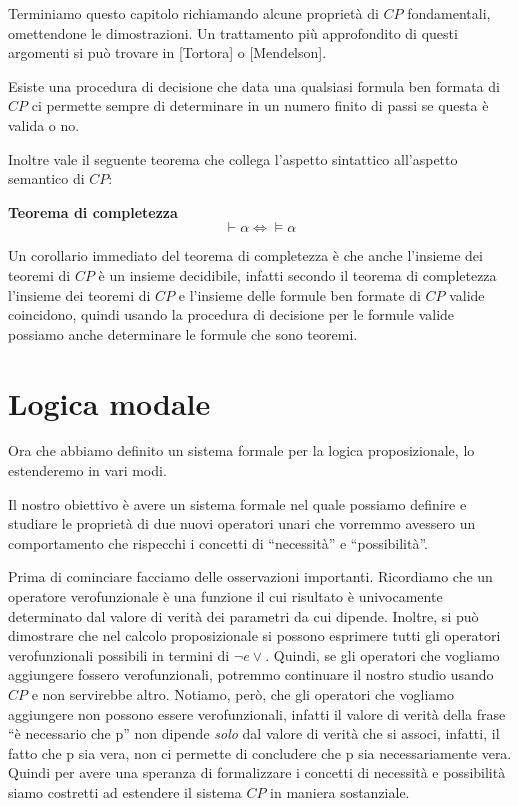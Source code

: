 \documentclass[a4paper, titlepage, 12pt]{report}
\begin{document}
Terminiamo questo capitolo richiamando alcune proprietà di $CP$ fondamentali, omettendone
le dimostrazioni. Un trattamento più approfondito di questi argomenti si può trovare in
[Tortora] o [Mendelson].

Esiste una procedura di decisione che data una qualsiasi formula ben formata di $CP$
ci permette sempre di determinare in un numero finito di passi se questa è valida o no.

Inoltre vale il seguente teorema che collega l'aspetto sintattico all'aspetto semantico
di $CP$:

\begin{flushleft}
\textbf{Teorema di completezza}
$$\vdash \alpha \Leftrightarrow \vDash \alpha$$
\end{flushleft}

Un corollario immediato del teorema di completezza è che anche l'insieme dei teoremi
di $CP$ è un insieme decidibile, infatti secondo il teorema di completezza
l'insieme dei teoremi di $CP$ e l'insieme delle formule ben formate di $CP$ valide
coincidono, quindi usando la procedura di decisione per le formule valide
possiamo anche determinare le formule che sono teoremi.

\section{Logica modale}
Ora che abbiamo definito un sistema formale per la logica proposizionale,
lo estenderemo in vari modi.

Il nostro obiettivo è avere un sistema formale nel quale possiamo definire e studiare
le proprietà di due nuovi operatori unari che vorremmo avessero un comportamento che rispecchi
i concetti di ``necessità'' e ``possibilità''.

Prima di cominciare facciamo delle osservazioni importanti.
Ricordiamo che un operatore verofunzionale è una funzione il cui risultato
è univocamente determinato dal valore di verità dei parametri da cui dipende.
Inoltre, si può dimostrare che nel calcolo proposizionale si possono esprimere
tutti gli operatori verofunzionali possibili in termini di $\neg e \vee$.
Quindi, se gli operatori che vogliamo aggiungere fossero verofunzionali, potremmo
continuare il nostro studio usando $CP$ e non servirebbe altro.
Notiamo, però, che gli operatori che vogliamo aggiungere non possono essere verofunzionali,
infatti il valore di verità della frase ``è necessario che p'' non dipende \textit{solo}
dal valore di verità che si associ, infatti, il fatto che p sia vera, non ci permette
di concludere che p sia necessariamente vera. Quindi per avere una speranza di formalizzare
i concetti di necessità e possibilità siamo costretti ad estendere il sistema $CP$
in maniera sostanziale.
\end{document}
